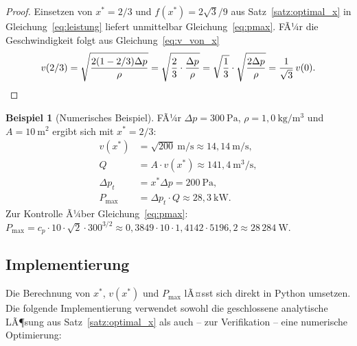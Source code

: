﻿\documentclass[a4paper,12pt]{article}
\theoremstyle{definition}
\newtheorem{beispiel}{Beispiel}
\begin{document}
\begin{proof}
	Einsetzen von $x^\ast = 2/3$ und $f(x^\ast) = 2\sqrt{3}/9$ aus
	Satz~\ref{satz:optimal_x} in Gleichung~\eqref{eq:leistung} liefert
	unmittelbar Gleichung~\eqref{eq:pmax}. FÃ¼r die Geschwindigkeit folgt
	aus Gleichung~\eqref{eq:v_von_x}
	\[
		v(2/3) = \sqrt{\frac{2(1-2/3)\Delta p}{\rho}}
		= \sqrt{\frac{2}{3}\cdot\frac{\Delta p}{\rho}}
		= \sqrt{\frac{1}{3}} \cdot \sqrt{\frac{2\Delta p}{\rho}}
		= \frac{1}{\sqrt{3}}\, v(0). \qedhere
	\]
\end{proof}

\begin{beispiel}[Numerisches Beispiel]
	\label{bsp:numerisch}
	FÃ¼r $\Delta p = 300\ \mathrm{Pa}$, $\rho = 1{,}0\ \mathrm{kg/m^3}$ und
	$A = 10\ \mathrm{m^2}$ ergibt sich mit $x^\ast = 2/3$:
	\begin{align*}
		v(x^\ast) &= \sqrt{200}\ \mathrm{m/s} \approx 14{,}14\ \mathrm{m/s}, \\
		Q &= A \cdot v(x^\ast) \approx 141{,}4\ \mathrm{m^3/s}, \\
		\Delta p_t &= x^\ast \Delta p = 200\ \mathrm{Pa}, \\
		P_{\max} &= \Delta p_t \cdot Q \approx 28{,}3\ \mathrm{kW}.
	\end{align*}
	Zur Kontrolle Ã¼ber Gleichung~\eqref{eq:pmax}:
	$P_{\max} = c_p \cdot 10 \cdot \sqrt{2} \cdot 300^{3/2}
	\approx 0{,}3849 \cdot 10 \cdot 1{,}4142 \cdot 5196{,}2
	\approx 28\,284\ \mathrm{W}$. \checkmark
\end{beispiel}

\subsection{Implementierung}

Die Berechnung von $x^\ast$, $v(x^\ast)$ und $P_{\max}$ lÃ¤sst sich direkt
in Python umsetzen. Die folgende Implementierung verwendet sowohl die
geschlossene analytische LÃ¶sung aus Satz~\ref{satz:optimal_x} als auch
-- zur Verifikation -- eine numerische Optimierung:
\end{document}
